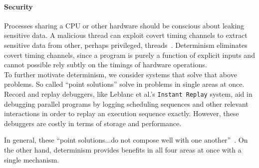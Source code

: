 \paragraph{Security} Processes sharing a CPU or other hardware should be
conscious about leaking sensitive data. A malicious thread can exploit covert
timing channels to extract sensitive data from other, perhaps privileged,
threads~\cite{Aviram10cloud}. Determinism eliminates covert timing channels,
since a program is purely a function of explicit inputs and cannot possible rely
subtly on the timings of hardware operations.
\\

To further motivate determinism, we consider systems that solve that above
problems. So called ``point solutions'' solve in problems in single areas at
once. Record and replay debuggers, like Leblanc et al.'s {\tt Instant Replay}
system, aid in debugging parallel programs by logging scheduling sequences and
other relevant interactions in order to replay an execution sequence exactly.
However, these debuggers are costly in terms of storage and performance.
\iffalse Even with replay ability, the execution sequence is still arbitrary and
gives the programmer no intuition about the program's behavior. \fi
In general, these ``point solutions...do not compose well with one
another''~\cite{Bergan11}. On the other hand, determinism provides benefits in
all four areas at once with a single mechanism.

\iffalse
\begin{itemize}
	\item Deterministic execution benefits, four main areas
	\begin{itemize}
		\item Debugging becomes easier, since bugs are always reproducible. Benefits
			enhanced by Determinator’s predictability.
		\item Testing: one-to-one mapping for inputs to outputs. Again, predictability
			and modularity can simplify designing tests.
		\item Fault tolerance
		\item Security: covert channels
	\end{itemize}
	\item "Point solutions" in particular areas are unrelated to each other and do
		not compose well. (Find point solutions to go into relevant work.)
	\item Determinism is solution offering benefits in all areas at once.
	\item Determinator’s design also provides predictability. Programmers can
		reason about code without having to make assumptions: nothing is arbitrary.
		"Program logic alone" determines how a program proceeds.
	\item Linux is widely used, deployed on millions of machines. Potential for
		uptake is very high if we can make the implementation reasonably easy to
		patch.
	\item Aviram compared Determinator to Linux, but we can compare deterministic
		Linux to nondeterministic Linux for nearly optimal evaluation of this design.
\end{itemize}
\fi

